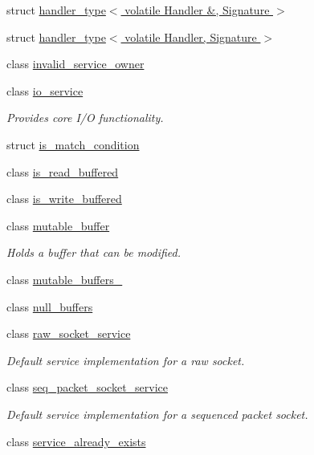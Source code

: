 \begin{DoxyCompactItemize}
\item 
struct \hyperlink{structasio_1_1handler__type_3_01volatile_01_handler_01_6_00_01_signature_01_4}{handler\+\_\+type$<$ volatile Handler \&, Signature $>$}
\item 
struct \hyperlink{structasio_1_1handler__type_3_01volatile_01_handler_00_01_signature_01_4}{handler\+\_\+type$<$ volatile Handler, Signature $>$}
\item 
class \hyperlink{classasio_1_1invalid__service__owner}{invalid\+\_\+service\+\_\+owner}
\item 
class \hyperlink{classasio_1_1io__service}{io\+\_\+service}
\begin{DoxyCompactList}\small\item\em Provides core I/\+O functionality. \end{DoxyCompactList}\item 
struct \hyperlink{structasio_1_1is__match__condition}{is\+\_\+match\+\_\+condition}
\item 
class \hyperlink{classasio_1_1is__read__buffered}{is\+\_\+read\+\_\+buffered}
\item 
class \hyperlink{classasio_1_1is__write__buffered}{is\+\_\+write\+\_\+buffered}
\item 
class \hyperlink{classasio_1_1mutable__buffer}{mutable\+\_\+buffer}
\begin{DoxyCompactList}\small\item\em Holds a buffer that can be modified. \end{DoxyCompactList}\item 
class \hyperlink{classasio_1_1mutable__buffers__1}{mutable\+\_\+buffers\+\_}
\item 
class \hyperlink{classasio_1_1null__buffers}{null\+\_\+buffers}
\item 
class \hyperlink{classasio_1_1raw__socket__service}{raw\+\_\+socket\+\_\+service}
\begin{DoxyCompactList}\small\item\em Default service implementation for a raw socket. \end{DoxyCompactList}\item 
class \hyperlink{classasio_1_1seq__packet__socket__service}{seq\+\_\+packet\+\_\+socket\+\_\+service}
\begin{DoxyCompactList}\small\item\em Default service implementation for a sequenced packet socket. \end{DoxyCompactList}\item 
class \hyperlink{classasio_1_1service__already__exists}{service\+\_\+already\+\_\+exists}

\end{DoxyCompactItemize}

